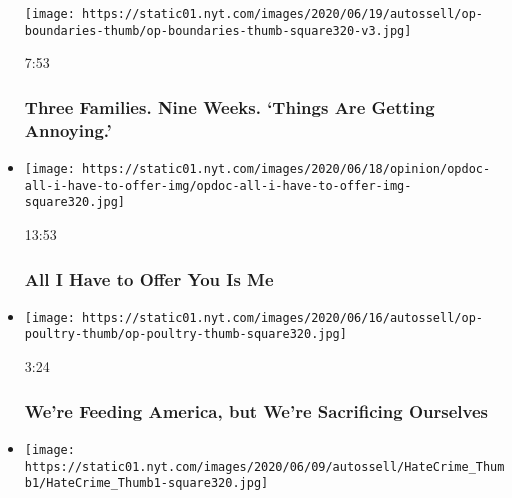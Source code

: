 \begin{itemize}
  \texttt{[image: https://static01.nyt.com/images/2020/06/19/autossell/op-boundaries-thumb/op-boundaries-thumb-square320-v3.jpg]}

  7:53

  \hypertarget{three-families-nine-weeks-things-are-getting-annoying}{%
  \subsubsection{Three Families. Nine Weeks. `Things Are Getting
  Annoying.'}\label{three-families-nine-weeks-things-are-getting-annoying}}
\item
  \href{https://www.nytimes.com/video/opinion/100000007133685/all-i-have-to-offer-you-is-me.html?action=click\&module=video-series-bar\&region=header\&pgtype=Article\&playlistId=video/opinion}{}

  \texttt{[image: https://static01.nyt.com/images/2020/06/18/opinion/opdoc-all-i-have-to-offer-img/opdoc-all-i-have-to-offer-img-square320.jpg]}

  13:53

  \hypertarget{all-i-have-to-offer-you-is-me}{%
  \subsubsection{All I Have to Offer You Is
  Me}\label{all-i-have-to-offer-you-is-me}}
\item
  \href{https://www.nytimes.com/video/opinion/100000007184138/coronavirus-tyson-poultry.html?action=click\&module=video-series-bar\&region=header\&pgtype=Article\&playlistId=video/opinion}{}

  \texttt{[image: https://static01.nyt.com/images/2020/06/16/autossell/op-poultry-thumb/op-poultry-thumb-square320.jpg]}

  3:24

  \hypertarget{were-feeding-america-but-were-sacrificing-ourselves}{%
  \subsubsection{We're Feeding America, but We're Sacrificing
  Ourselves}\label{were-feeding-america-but-were-sacrificing-ourselves}}
\item
  \href{https://www.nytimes.com/video/opinion/100000007179746/hate-crime-bill-ahmaud-arbery.html?action=click\&module=video-series-bar\&region=header\&pgtype=Article\&playlistId=video/opinion}{}

  \texttt{[image: https://static01.nyt.com/images/2020/06/09/autossell/HateCrime\_Thumb1/HateCrime\_Thumb1-square320.jpg]}


\end{itemize}
